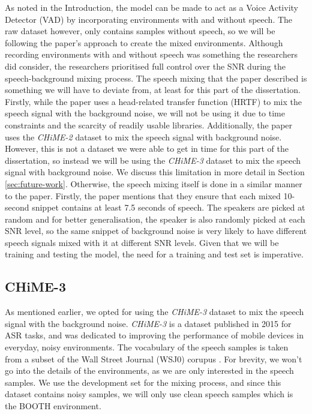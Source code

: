 \documentclass[logo,bsc,singlespacing,parskip,online]{infthesis}
\newcommand{\chime}[1]{\textit{CHiME-#1}\xspace}
\begin{document}
As noted in the Introduction, the model can be made to act as a Voice Activity Detector (VAD) by incorporating environments with and without speech.
The raw dataset however, only contains samples without speech, so we will be following the paper's approach to create the mixed environments.
Although recording environments with and without speech was something the researchers did consider, the researchers prioritised full control over the SNR during the speech-background mixing process.
The speech mixing that the paper described is something we 
will have to deviate from, at least for this part of the dissertation.
Firstly, while the paper uses a head-related transfer function (HRTF) to mix the speech signal with the background noise,
we will not be using it due to time constraints and the scarcity of readily usable libraries.
Additionally, the paper uses the \chime{2} dataset \citep{vincent_second_2013} to mix the speech signal with background noise.
However, this is not a dataset we were able to get in time for this part 
of the dissertation, so instead we will be using the \chime{3} dataset \citep{barker_third_2015} to mix the speech signal with background noise.
We discuss this limitation in more detail in Section \ref{sec:future-work}.
Otherwise, the speech mixing itself is done in a similar manner to the paper.
Firstly, the paper mentions that they ensure that each mixed 10-second snippet contains at least 7.5 seconds of speech.
The speakers are picked at random and for better generalisation, the speaker is also randomly 
picked at each SNR level, so the same snippet of background noise is very likely 
to have different speech signals mixed with it at different SNR levels.
Given that we will be training and testing the model, the need for a training and test set is imperative. 

\subsection{CHiME-3}
 As mentioned earlier, we opted for using the \chime{3} dataset to mix the speech signal with the background noise. 
\chime{3} is a dataset published in 2015 for ASR tasks, and was dedicated to improving the performance of mobile devices 
in everyday, noisy environments. The vocabulary of the speech samples is taken from a subset of the Wall Street Journal (WSJ0) corupus \citep{wsj0}.
For brevity, we won't go into the details of the environments, as we 
are only interested in the speech samples. 
We use the development set for the mixing process,
and since this dataset contains noisy samples, we will only use clean speech samples 
which is the BOOTH environment.
\end{document}
